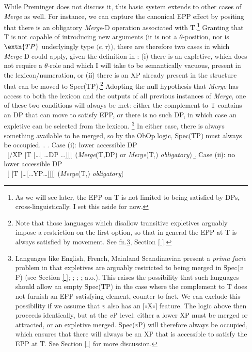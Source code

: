\documentclass[11pt, letterpaper]{paper_nick}
\newcommand{\fm}[1]{[$\circ$#1$\circ$]}
\begin{document}
While Preminger does not discuss it, this basic system extends to other cases of \emph{Merge} as well. For instance, we can capture the canonical EPP effect by positing that there is an obligatory \emph{Merge}-{D} operation associated with T.\footnote{As we will see later, the EPP on T is not limited to being satisfied by DPs, cross-linguistically. I set this aside for now.} Granting that T is not capable of introducing new arguments (it is not a $\theta$-position, nor is $\extn{TP}$ underlyingly type $\langle e,\tau\rangle$), there are therefore two cases in which \emph{Merge}-D could apply, given the definition in \Last: (i) there is an expletive, which does not require a $\theta$-role and which I will take to be semantically vacuous, present in the lexicon/numeration, or (ii) there is an XP already present in the structure that can be moved to Spec(TP).\footnote{\label{transexp}Note that those languages which disallow transitive expletives arguably impose a restriction on the first option, so that in general the EPP at T is always satisfied by movement. See fn.\ref{expl1}, Section \ref{ }.} Adopting the null hypothesis that \emph{Merge} has access to both the lexicon and the outputs of all previous instances of \emph{Merge}, one of these two conditions will always be met: either the complement to T contains an DP that can move to satisfy EPP, or there is no such DP, in which case an expletive can be selected from the lexicon. 
\footnote{\label{expl1} Languages like English, French, Mainland Scandinavian present a \emph{prima facie} problem in that expletives are arguably restricted to being merged in Spec($v$P) (see Section \ref{ }; \citealt{richards06}; \citealt{deal09}; \citealt{wu}; a.o.). This raises the possibility that such languages should allow an empty Spec(TP) in the case where the complement to T does not furnish an EPP-satisfying element, counter to fact. We can exclude this possibility if we assume that $v$ also has an \fm{X} feature. The logic above then proceeds identically, but at the $v$P level: either a lower XP must be merged or attracted, or an expletive merged. Spec($v$P) will therefore always be occupied, which ensures that there will always be an XP that is accessible to satisfy the EPP at T. See Section \ref{ } for more discussion.} In either case, there is always something available to be merged, so by the ObOp logic, Spec(TP) must always be occupied. 
\ex. \a. Case (i): lower accessible DP\\
\ [/XP [T [\ldots[ \ldots DP \ldots]]]] \hfill (\emph{Merge}(T,DP) or \emph{Merge}(T,) \emph{obligatory})
\b. Case (ii): no lower accessible DP\\
\ [ [T [\ldots[\ldots YP\ldots]]]] \hfill (\emph{Merge}(T,) \emph{obligatory})
\end{document}
